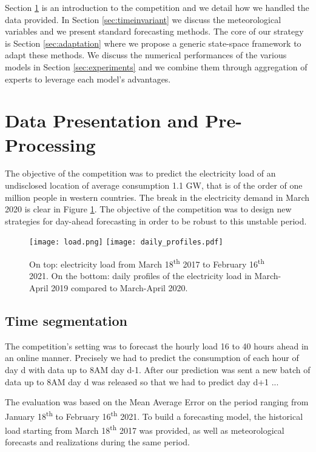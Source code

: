 \documentclass[transmag]{IEEEtran}
\begin{document}
Section \ref{sec:data_pres} is an introduction to the competition and we detail how we handled the data provided. In Section \ref{sec:timeinvariant} we discuss the meteorological variables and we present standard forecasting methods. The core of our strategy is Section \ref{sec:adaptation} where we propose a generic state-space framework to adapt these methods. We discuss the numerical performances of the various models in Section \ref{sec:experiments} and we combine them through aggregation of experts to leverage each model's advantages.


\section{Data Presentation and Pre-Processing}\label{sec:data_pres}
The objective of the competition was to predict the electricity load of an undisclosed location of average consumption 1.1 GW, that is of the order of one million people in western countries. The break in the electricity demand in March 2020 is clear in Figure \ref{fig:daily_profile}. The objective of the competition was to design new strategies for day-ahead forecasting in order to be robust to this unstable period.
\begin{figure}
    \centering
    \texttt{[image: load.png]}
    \texttt{[image: daily\_profiles.pdf]}
    \caption{On top: electricity load from March 18\textsuperscript{th} 2017 to February 16\textsuperscript{th} 2021. On the bottom: daily profiles of the electricity load in March-April 2019 compared to March-April 2020.}
    \label{fig:daily_profile}
\end{figure}

\subsection{Time segmentation}
The competition's setting was to forecast the hourly load 16 to 40 hours ahead in an online manner. Precisely we had to predict the consumption of each hour of day d with data up to 8AM day d-1. After our prediction was sent a new batch of data up to 8AM day d was released so that we had to predict day d+1 ...

The evaluation was based on the Mean Average Error on the period ranging from January 18\textsuperscript{th} to February 16\textsuperscript{th} 2021. To build a forecasting model, the historical load starting from March 18\textsuperscript{th} 2017 was provided, as well as meteorological forecasts and realizations during the same period.
\end{document}
